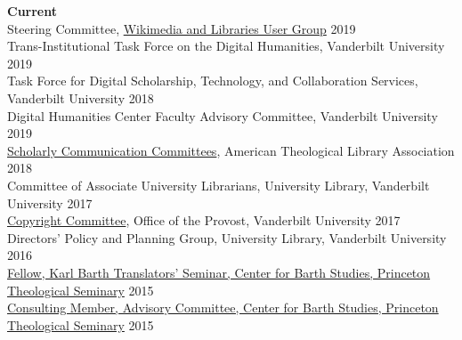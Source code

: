 \documentclass[10pt]{res} %
\begin{document}
\begin{resume}
{\bf Current} \\
Steering Committee, \href{https://meta.wikimedia.org/wiki/Wikimedia_and_Libraries_User_Group}{Wikimedia and Libraries User Group} \hfill 2019\\ 
Trans-Institutional Task Force on the Digital Humanities, Vanderbilt University \hfill 2019\\
Task Force for Digital Scholarship, Technology, and Collaboration Services, Vanderbilt University \hfill 2018\\
Digital Humanities Center Faculty Advisory Committee, Vanderbilt University \hfill 2019\\
\href{https://www.atla.com/about/committees-councils-task-forces/scholarly-communication-committee/}{Scholarly Communication Committees}, American Theological Library Association \hfill 2018\\
Committee of Associate University Librarians, University Library, Vanderbilt University \hfill 2017\\
\href{https://vanderbilt.edu/provost/people/cyrus/committees/copyright-committee.php}{Copyright Committee}, Office of the Provost, Vanderbilt University \hfill 2017\\
Directors' Policy and Planning Group, University Library, Vanderbilt University \hfill 2016\\
\href{http://barth.ptsem.edu/event/translators-seminar}{Fellow, Karl Barth Translators’ Seminar, Center for Barth Studies, Princeton Theological Seminary} \hfill 2015\\
\href{http://barth.ptsem.edu/about-cbs/the-advisory-committee}{Consulting Member, Advisory Committee, Center for Barth Studies, Princeton Theological Seminary}  \hfill 2015 \\


\end{resume}
\end{document}
